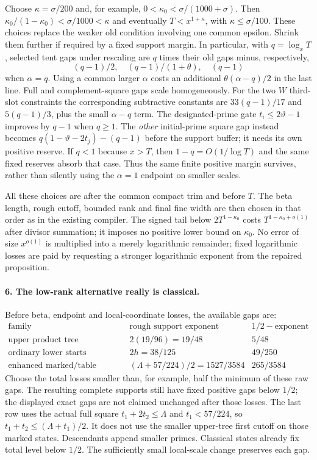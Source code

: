 Choose $\kappa=\sigma/200$ and, for example,
$0<\kappa_0<\sigma/(1000+\sigma)$. Then
$\kappa_0/(1-\kappa_0)<\sigma/1000<\kappa$ and eventually
$T<x^{1+\kappa}$, with $\kappa\le\sigma/100$.
These choices replace the weaker old condition involving one common
epsilon. Shrink them further if required by a fixed support margin.
In particular, with $q=\log_xT$, selected tent gaps under rescaling
are $q$ times their old gaps minus, respectively,
\[
 (q-1)/2,\quad(q-1)/(1+\theta),\quad(q-1)
\]
when $\alpha=q$. Using a common larger $\alpha$ costs an additional
$\theta(\alpha-q)/2$ in the last line. Full and complement-square
gaps scale homogeneously. For the two $W$ third-slot constraints the
corresponding subtractive constants are $33(q-1)/17$ and
$5(q-1)/3$, plus the small $\alpha-q$ term. The designated-prime
gate $t_i\le2\vartheta-1$ improves by $q-1$ when $q\ge1$.
The \emph{other} initial-prime square gap instead becomes
$q(1-\vartheta-2t_j)-(q-1)$ before the support buffer; it needs its
own positive reserve. If $q<1$ because $x>T$, then $1-q=O(1/\log T)$
and the same fixed reserves absorb that case.
Thus the same finite positive margin survives, rather than silently
using the $\alpha=1$ endpoint on smaller scales.

All these choices are after the common compact trim and before $T$.
The beta length, rough cutoff, bounded rank and final fine width are
then chosen in that order as in the existing compiler. The signed tail
below $2T^{1-\kappa_0}$ costs $T^{1-\kappa_0+o(1)}$ after divisor
summation; it imposes no positive lower bound on $\kappa_0$.
No error of size $x^{o(1)}$ is multiplied into a merely logarithmic
remainder; fixed logarithmic losses are paid by requesting a stronger
logarithmic exponent from the repaired proposition.

\paragraph{6. The low-rank alternative really is classical.}
Before beta, endpoint and local-coordinate losses, the available gaps are:
\[
 \begin{array}{c|c|c}
 \text{family}&\text{rough support exponent}&1/2-\text{exponent}\\\hline
 \text{upper product tree}&2(19/96)=19/48&5/48\\
 \text{ordinary lower starts}&2h=38/125&49/250\\
 \text{enhanced marked/table families}&(\Lambda+57/224)/2=1527/3584
                                      &265/3584
 \end{array}
\]
Choose the total losses smaller than, for example, half the minimum
of these raw gaps. The resulting complete supports still have fixed
positive gaps below $1/2$; the displayed exact gaps are not claimed
unchanged after those losses.
The last row uses the actual full square $t_1+2t_2\le\Lambda$ and
$t_1<57/224$, so $t_1+t_2\le(\Lambda+t_1)/2$. It does not use the
smaller upper-tree first cutoff on those marked states. Descendants
append smaller primes. Classical states already fix total level below
$1/2$. The sufficiently small local-scale change preserves each gap.

